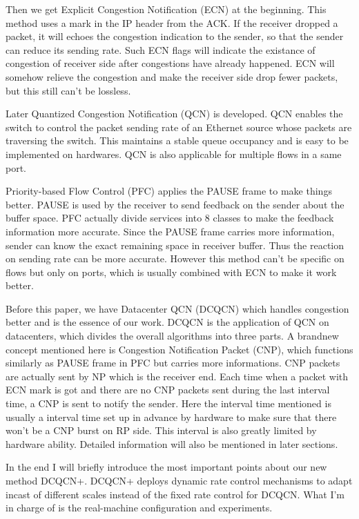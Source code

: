 \documentclass{article}
\begin{document}
Then we get Explicit Congestion Notification (ECN) at the beginning.
This method uses a mark in the IP header from the ACK.
If the receiver dropped a packet, it will echoes the congestion indication to the sender, so that the sender can reduce its sending rate.
Such ECN flags will indicate the existance of congestion of receiver side after congestions have already happened.
ECN will somehow relieve the congestion and make the receiver side drop fewer packets, but this still can't be lossless.

Later Quantized Congestion Notification (QCN) is developed.
QCN enables the switch to control the packet sending rate of an Ethernet source whose packets are traversing the switch.
This maintains a stable queue occupancy and is easy to be implemented on hardwares.
QCN is also applicable for multiple flows in a same port.

Priority-based Flow Control (PFC) applies the PAUSE frame to make things better.
PAUSE is used by the receiver to send feedback on the sender about the buffer space.
PFC actually divide services into 8 classes to make the feedback information more accurate.
Since the PAUSE frame carries more information, sender can know the exact remaining space in receiver buffer.
Thus the reaction on sending rate can be more accurate.
However this method can't be specific on flows but only on ports, which is usually combined with ECN to make it work better.

Before this paper, we have Datacenter QCN (DCQCN) which handles congestion better and is the essence of our work.
DCQCN is the application of QCN on datacenters, which divides the overall algorithms into three parts.
A brandnew concept mentioned here is Congestion Notification Packet (CNP), which functions similarly as PAUSE frame in PFC but carries more informations.
CNP packets are actually sent by NP which is the receiver end.
Each time when a packet with ECN mark is got and there are no CNP packets sent during the last interval time, a CNP is sent to notify the
sender.
Here the interval time mentioned is usually a interval time set up in advance by hardware to make sure that there won't be a CNP burst on
RP side.
This interval is also greatly limited by hardware ability.
Detailed information will also be mentioned in later sections.

In the end I will briefly introduce the most important points about our new method DCQCN+.
DCQCN+ deploys dynamic rate control mechanisms to adapt incast of different scales instead of the fixed rate control for DCQCN.
What I'm in charge of is the real-machine configuration and experiments.
\end{document}
